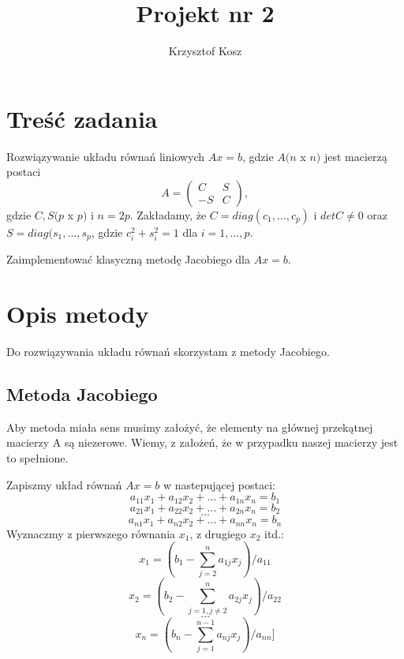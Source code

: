 \documentclass{article}
\title{Projekt nr 2}
\author{Krzysztof Kosz}
\begin{document}
\maketitle

\tableofcontents


\section{Treść zadania}

Rozwiązywanie układu równań liniowych \(Ax = b\), gdzie \(A(n\) x \(n)\) jest macierzą postaci 
\[A=\begin{pmatrix}
C & S\\
-S & C
\end{pmatrix},\]
gdzie \(C,S(p\) x \(p)\) i \(n=2p\). Zakładamy, że \(C=diag(c_1,\dots,c_p)\) i \(detC\not=0\) oraz \(S=diag(s_1,\dots,s_p\), gdzie \(c_i^2+s_i^2=1\) dla \(i=1,\dots,p\).

Zaimplementować klasyczną metodę Jacobiego dla \(Ax=b\).

\section{Opis metody}

Do rozwiązywania układu równań skorzystam z metody Jacobiego.

\subsection{Metoda Jacobiego}

Aby metoda miała sens musimy założyć, że elementy na głównej przekątnej macierzy A są niezerowe. Wiemy, z założeń, że w przypadku naszej macierzy jest to spełnione.

Zapiszmy układ równań \(Ax=b\) w nastepującej postaci:
\[a_{11}x_1 + a_{12}x_2 + \dots + a_{1n}x_n=b_1\]
\[a_{21}x_1 + a_{22}x_2 + \dots + a_{2n}x_n=b_2\]
\[\dots\]
\[a_{n1}x_1 + a_{n2}x_2 + \dots + a_{nn}x_n=b_n\]
Wyznaczmy z pierwszego równania \(x_1\), z drugiego \(x_2\) itd.:
\[x_1=(b_1-\sum_{j=2}^{n}a_{1j}x_j)/a_{11}\]
\[x_2=(b_2-\sum_{j=1, j\not=2}^{n}a_{2j}x_j)/a_{22}\]
\[\dots\]
\[x_n=(b_n-\sum_{j=1}^{n-1}a_{nj}x_j)/a_{nn}]\]
\end{document}
